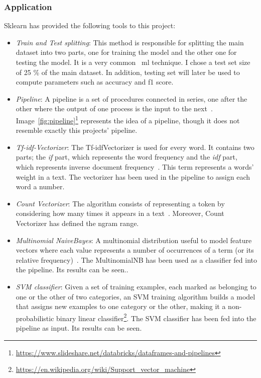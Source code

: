 \subsubsection{Application}
Sklearn has provided the following tools to this project:
\begin{itemize}
	\item \textit{Train and Test splitting}: This method is responsible for splitting the main dataset into two parts, one for training the model and the other one for testing the model. It is a very common ~\ac{ml} technique. I chose a test set size of 25 \% of the main dataset. In addition, testing set will later be used to compute parameters such as accuracy and f1 score.
	\item \textit{Pipeline}: A pipeline is a set of procedures connected in series, one after the other where the output of one process is the input to the next~\cite{pipeline1}. Image~\ref{fig:pipeline}\footnote{\url{https://www.slideshare.net/databricks/dataframes-and-pipelines}} represents the idea of a pipeline, though it does not resemble exactly this projects' pipeline.
	\item \textit{Tf-idf-Vectorizer}: The Tf-idfVectorizer is used for every word. It contains two parts; the \textit{if} part, which represents the word frequency and the \textit{idf} part, which represents inverse document frequency~\cite{tfidf1}. This term represents a words' weight in a text. The vectorizer has been used in the pipeline to assign each word a number. 
	\item \textit{Count Vectorizer}: The algorithm consists of representing a token by considering how many times it appears in a text~\cite{countvect1}. Moreover, Count Vectorizer has defined the ngram range.
	\item \textit{Multinomial NaiveBayes}: A multinomial distribution useful to model feature vectors where each value represents a number of occurrences of a term (or its relative frequency)~\cite{countvect1}. The MultinomialNB has been used as a classifier fed into the pipeline. Its results can be seen..
	\item \textit{SVM classifier}: Given a set of training examples, each marked as belonging to one or the other of two categories, an SVM training algorithm builds a model that assigns new examples to one category or the other, making it a non-probabilistic binary linear classifier\footnote{\url{https://en.wikipedia.org/wiki/Support_vector_machine}}. The SVM classifier has been  fed into the pipeline as input. Its results can be seen.

\end{itemize}

